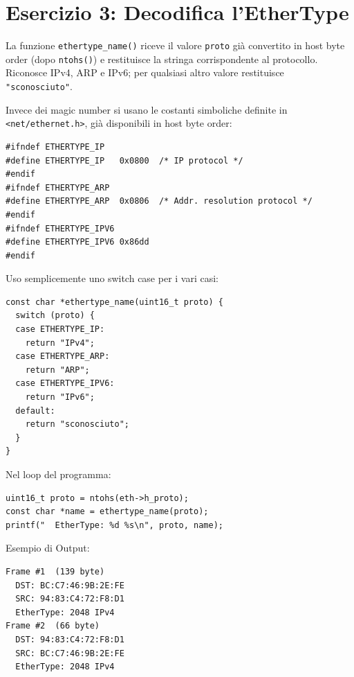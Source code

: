 \documentclass[a4paper,12pt]{article}
\begin{document}
\section{Esercizio 3: Decodifica l'EtherType}

La funzione \texttt{ethertype\_name()} riceve il valore \texttt{proto} già convertito in
host byte order (dopo \texttt{ntohs()}) e restituisce la stringa corrispondente al protocollo.
Riconosce IPv4, ARP e IPv6; per qualsiasi altro valore restituisce \texttt{"sconosciuto"}.

Invece dei magic number si usano le costanti simboliche definite in
\texttt{<net/ethernet.h>}, già disponibili in host byte order:

\begin{lstlisting}[caption={Costanti EtherType da net/ethernet.h (estratto)}]
#ifndef ETHERTYPE_IP
#define ETHERTYPE_IP   0x0800  /* IP protocol */
#endif
#ifndef ETHERTYPE_ARP
#define ETHERTYPE_ARP  0x0806  /* Addr. resolution protocol */
#endif
#ifndef ETHERTYPE_IPV6
#define ETHERTYPE_IPV6 0x86dd
#endif
\end{lstlisting}

Uso semplicemente uno switch case per i vari casi:
\begin{lstlisting}[caption={ethertype\_name() -- implementazione con costanti simboliche}]
const char *ethertype_name(uint16_t proto) {
  switch (proto) {
  case ETHERTYPE_IP:
    return "IPv4";
  case ETHERTYPE_ARP:
    return "ARP";
  case ETHERTYPE_IPV6:
    return "IPv6";
  default:
    return "sconosciuto";
  }
}
\end{lstlisting}

Nel loop del programma:
\begin{lstlisting}[caption={Uso nel loop di stampa}]
uint16_t proto = ntohs(eth->h_proto);
const char *name = ethertype_name(proto);
printf("  EtherType: %d %s\n", proto, name);
\end{lstlisting}

Esempio di Output:
\begin{lstlisting}[language={}, caption={Output -- Es.3}]
Frame #1  (139 byte)
  DST: BC:C7:46:9B:2E:FE
  SRC: 94:83:C4:72:F8:D1
  EtherType: 2048 IPv4
Frame #2  (66 byte)
  DST: 94:83:C4:72:F8:D1
  SRC: BC:C7:46:9B:2E:FE
  EtherType: 2048 IPv4
\end{lstlisting}

\end{document}
